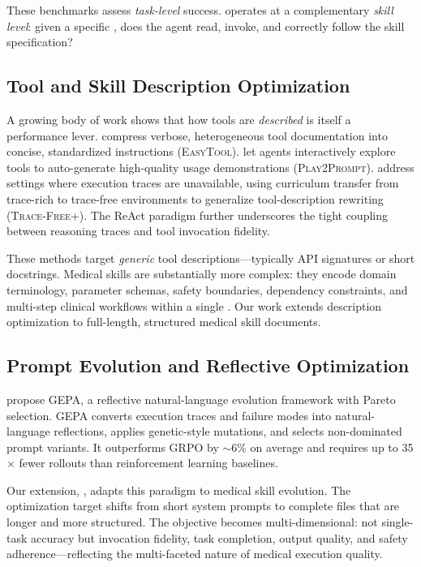 These benchmarks assess \emph{task-level} success.
\medskille operates at a complementary \emph{skill level}: given a specific \skillmd, does the agent read, invoke, and correctly follow the skill specification?

\subsection{Tool and Skill Description Optimization}
\label{sec:rw_tool_opt}

A growing body of work shows that how tools are \emph{described} is itself a performance lever.
\citet{easytool2024} compress verbose, heterogeneous tool documentation into concise, standardized instructions (\textsc{EasyTool}).
\citet{play2prompt2025} let agents interactively explore tools to auto-generate high-quality usage demonstrations (\textsc{Play2Prompt}).
\citet{tracefree2026} address settings where execution traces are unavailable, using curriculum transfer from trace-rich to trace-free environments to generalize tool-description rewriting (\textsc{Trace-Free+}).
The ReAct paradigm \citep{react2023} further underscores the tight coupling between reasoning traces and tool invocation fidelity.

These methods target \emph{generic} tool descriptions---typically API signatures or short docstrings.
Medical skills are substantially more complex: they encode domain terminology, parameter schemas, safety boundaries, dependency constraints, and multi-step clinical workflows within a single \skillmd.
Our work extends description optimization to full-length, structured medical skill documents.

\subsection{Prompt Evolution and Reflective Optimization}
\label{sec:rw_gepa}

\citet{gepa2025} propose \textsc{GEPA}, a reflective natural-language evolution framework with Pareto selection.
\textsc{GEPA} converts execution traces and failure modes into natural-language reflections, applies genetic-style mutations, and selects non-dominated prompt variants.
It outperforms GRPO by ${\sim}6$\% on average and requires up to 35$\times$ fewer rollouts than reinforcement learning baselines.

Our extension, \gepamed, adapts this paradigm to medical skill evolution.
The optimization target shifts from short system prompts to complete \skillmd files that are longer and more structured.
The objective becomes multi-dimensional: not single-task accuracy but invocation fidelity, task completion, output quality, and safety adherence---reflecting the multi-faceted nature of medical execution quality.

